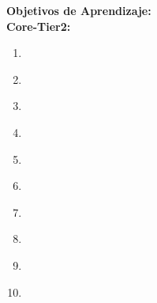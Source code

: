 \noindent \textbf{Objetivos de Aprendizaje:}\\
\noindent \textbf{Core-Tier2:}
\begin{enumerate}
	\setcounter{enumi}{0}
	\item \ARAssemblylevelmachineorganizationLOExplainTheTheNeumann\xspace[\ARAssemblylevelmachineorganizationLOExplainTheTheNeumannLevel]\label{sec:BOK:ARAssemblylevelmachineorganizationLOExplainTheTheNeumann}
	\item \ARAssemblylevelmachineorganizationLODescribeHowIs\xspace[\ARAssemblylevelmachineorganizationLODescribeHowIsLevel]\label{sec:BOK:ARAssemblylevelmachineorganizationLODescribeHowIs}
	\item \ARAssemblylevelmachineorganizationLODescribeInstruction\xspace[\ARAssemblylevelmachineorganizationLODescribeInstructionLevel]\label{sec:BOK:ARAssemblylevelmachineorganizationLODescribeInstruction}
	\item \ARAssemblylevelmachineorganizationLOSummarize\xspace[\ARAssemblylevelmachineorganizationLOSummarizeLevel]\label{sec:BOK:ARAssemblylevelmachineorganizationLOSummarize}
	\item \ARAssemblylevelmachineorganizationLODemonstrateHow\xspace[\ARAssemblylevelmachineorganizationLODemonstrateHowLevel]\label{sec:BOK:ARAssemblylevelmachineorganizationLODemonstrateHow}
	\item \ARAssemblylevelmachineorganizationLOExplainDifferent\xspace[\ARAssemblylevelmachineorganizationLOExplainDifferentLevel]\label{sec:BOK:ARAssemblylevelmachineorganizationLOExplainDifferent}
	\item \ARAssemblylevelmachineorganizationLOExplainHowAre\xspace[\ARAssemblylevelmachineorganizationLOExplainHowAreLevel]\label{sec:BOK:ARAssemblylevelmachineorganizationLOExplainHowAre}
	\item \ARAssemblylevelmachineorganizationLOExplainTheOf\xspace[\ARAssemblylevelmachineorganizationLOExplainTheOfLevel]\label{sec:BOK:ARAssemblylevelmachineorganizationLOExplainTheOf}
	\item \ARAssemblylevelmachineorganizationLOWriteSimple\xspace[\ARAssemblylevelmachineorganizationLOWriteSimpleLevel]\label{sec:BOK:ARAssemblylevelmachineorganizationLOWriteSimple}
	\item \ARAssemblylevelmachineorganizationLOShow\xspace[\ARAssemblylevelmachineorganizationLOShowLevel]\label{sec:BOK:ARAssemblylevelmachineorganizationLOShow}
\end{enumerate}


